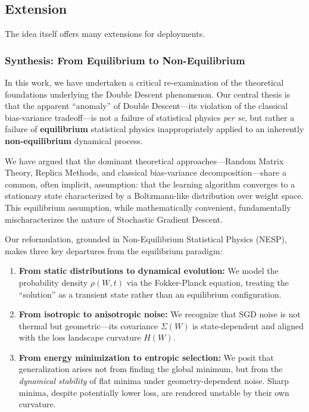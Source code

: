 \subsection{Extension}

The idea itself offers many extensions for deployments.

\subsubsection{Synthesis: From Equilibrium to Non-Equilibrium}

In this work, we have undertaken a critical re-examination of the theoretical foundations underlying the Double Descent phenomenon. Our central thesis is that the apparent ``anomaly'' of Double Descent---its violation of the classical bias-variance tradeoff---is not a failure of statistical physics \textit{per se}, but rather a failure of \textbf{equilibrium} statistical physics inappropriately applied to an inherently \textbf{non-equilibrium} dynamical process.

We have argued that the dominant theoretical approaches---Random Matrix Theory, Replica Methods, and classical bias-variance decomposition---share a common, often implicit, assumption: that the learning algorithm converges to a stationary state characterized by a Boltzmann-like distribution over weight space. This equilibrium assumption, while mathematically convenient, fundamentally mischaracterizes the nature of Stochastic Gradient Descent.

Our reformulation, grounded in Non-Equilibrium Statistical Physics (NESP), makes three key departures from the equilibrium paradigm:

\begin{enumerate}[topsep=1pt,itemsep=1pt]
    \item \textbf{From static distributions to dynamical evolution:} We model the probability density $\rho(W,t)$ via the Fokker-Planck equation, treating the ``solution'' as a transient state rather than an equilibrium configuration.
    
    \item \textbf{From isotropic to anisotropic noise:} We recognize that SGD noise is not thermal but geometric---its covariance $\Sigma(W)$ is state-dependent and aligned with the loss landscape curvature $H(W)$.
    
    \item \textbf{From energy minimization to entropic selection:} We posit that generalization arises not from finding the global minimum, but from the \textit{dynamical stability} of flat minima under geometry-dependent noise. Sharp minima, despite potentially lower loss, are rendered unstable by their own curvature.
\end{enumerate}

